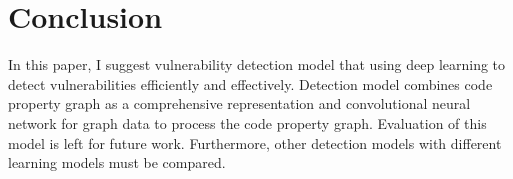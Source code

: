 \section{Conclusion}
\label{section:conclusion}

In this paper, I suggest vulnerability detection model that using deep learning to detect vulnerabilities efficiently and effectively.
Detection model combines code property graph as a comprehensive representation and convolutional neural network for graph data to process the code property graph.
Evaluation of this model is left for future work.
Furthermore, other detection models with different learning models must be compared.